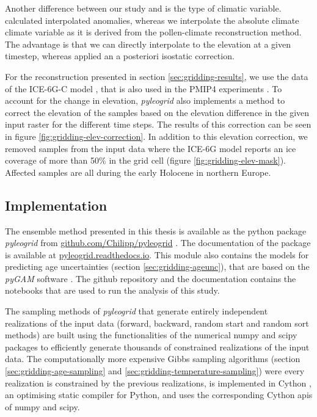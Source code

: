 \begin{refsection}
Another difference between our study and \cite{MauriDavisCollinsEtAl2015} is the type of climatic variable. \cite{MauriDavisCollinsEtAl2015} calculated interpolated anomalies, whereas we interpolate the absolute climate climate variable as it is derived from the pollen-climate reconstruction method. The advantage is that we can directly interpolate to the elevation at a given timestep, whereas \cite{MauriDavisCollinsEtAl2015} applied an a posteriori isostatic correction. 

For the reconstruction presented in section \ref{sec:gridding-results}, we use the data of the ICE-6G-C model \citep{ArgusPeltierDrummondEtAl2014, PeltierArgusDrummond2015}, that is also used in the PMIP4 experiments \citep{IvanovicGregoireKageyamaEtAl2016, Otto-BliesnerBraconnotHarrisonEtAl2017, KageyamaBraconnotHarrisonEtAl2018}. To account for the change in elevation, \textit{pyleogrid} also implements a method to correct the elevation of the samples based on the elevation difference in the given input raster for the different time steps. The results of this correction can be seen in figure \ref{fig:gridding-elev-correction}. In addition to this elevation correction, we removed samples from the input data where the ICE-6G model reports an ice coverage of more than 50\% in the grid cell (figure \ref{fig:gridding-elev-mask}). Affected samples are all during the early Holocene in northern Europe.

\subsection{Implementation}  \label{sec:gridding-package}
The ensemble method presented in this thesis is available as the python package \textit{pyleogrid} from \href{https://github.com/Chilipp/pyleogrid}{github.com/Chilipp/pyleogrid} . The documentation of the package is available at \href{https://pyleogrid.readthedocs.io}{pyleogrid.readthedocs.io}. This module also contains the models for predicting age uncertainties (section \ref{sec:gridding-ageunc}), that are based on the \textit{pyGAM} software \citep{ServenBrummittAbedi2018}. The github repository and the documentation contains the notebooks that are used to run the analysis of this study.

The sampling methods of \textit{pyleogrid} that generate entirely independent realizations of the input data (forward, backward, random start and random sort methods) are built using the functionalities of the numerical numpy and scipy packages \citep{Oliphant2006, JonesOliphantPetersonEtAl2001} to efficiently generate thousands of constrained realizations of the input data. The computationally more expensive Gibbs sampling algorithms (section \ref{sec:gridding-age-sampling} and \ref{sec:gridding-temperature-sampling}) were every realization is constrained by the previous realizations, is implemented in Cython \citep{BehnelBradshawCitroEtAl2011}, an optimising static compiler for Python, and uses the corresponding Cython \glspl{api} of numpy and scipy.


\end{refsection}
